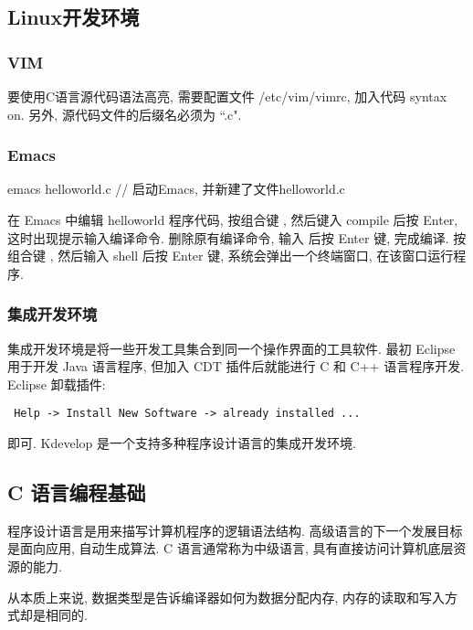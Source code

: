 
\subsection{Linux开发环境}
\subsubsection{VIM}
要使用C语言源代码语法高亮, 需要配置文件 /etc/vim/vimrc, 加入代码 syntax on.
另外, 源代码文件的后缀名必须为 ``.c".

\subsubsection{Emacs}
\begin{shell}
 emacs helloworld.c // 启动Emacs, 并新建了文件helloworld.c
\end{shell}
在 Emacs 中编辑 helloworld 程序代码, 按组合键 , 然后键入 compile 后按 Enter,
这时出现提示输入编译命令. 删除原有编译命令, 输入 
后按 Enter 键, 完成编译. 按组合键 , 然后输入 shell 后按 Enter 键, 
系统会弹出一个终端窗口, 在该窗口运行程序.

\subsubsection{集成开发环境}
集成开发环境是将一些开发工具集合到同一个操作界面的工具软件.
最初 Eclipse 用于开发 Java 语言程序, 但加入 CDT 插件后就能进行 C 和 C++ 语言程序开发.
Eclipse 卸载插件: 
\begin{verbatim}
 Help -> Install New Software -> already installed ...
\end{verbatim}
即可.
Kdevelop 是一个支持多种程序设计语言的集成开发环境.


\subsection{C 语言编程基础}
程序设计语言是用来描写计算机程序的逻辑语法结构. 高级语言的下一个发展目标是面向应用, 
自动生成算法. C 语言通常称为中级语言, 具有直接访问计算机底层资源的能力. 

从本质上来说, 数据类型是告诉编译器如何为数据分配内存, 内存的读取和写入方式却是相同的.

